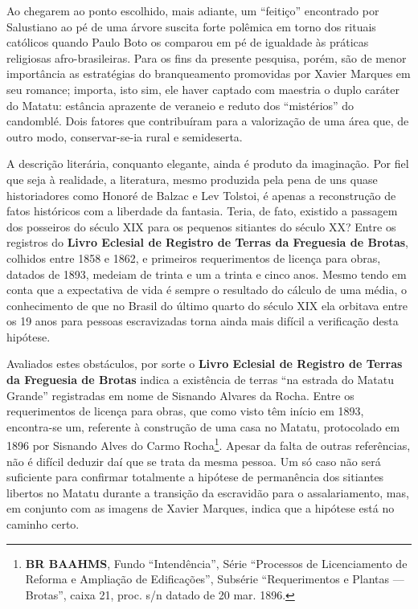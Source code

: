 Ao chegarem ao ponto escolhido, mais adiante, um ``feitiço'' encontrado por Salustiano ao pé de uma árvore suscita forte polêmica em torno dos rituais católicos quando Paulo Boto os comparou em pé de igualdade às práticas religiosas afro-brasileiras. Para os fins da presente pesquisa, porém, são de menor importância as estratégias do branqueamento promovidas por Xavier Marques em seu romance; importa, isto sim, ele haver captado com maestria o duplo caráter do Matatu: estância aprazente de veraneio e reduto dos ``mistérios'' do candomblé. Dois fatores que contribuíram para a valorização de uma área que, de outro modo, conservar-se-ia rural e semideserta.

A descrição literária, conquanto elegante, ainda é produto da imaginação. Por fiel que seja à realidade, a literatura, mesmo produzida pela pena de uns quase historiadores como Honoré de Balzac e Lev Tolstoi, é apenas a reconstrução de fatos históricos com a liberdade da fantasia. Teria, de fato, existido a passagem dos posseiros do século XIX para os pequenos sitiantes do século XX? Entre os registros do \textbf{Livro Eclesial de Registro de Terras da Freguesia de Brotas}, colhidos entre 1858 e 1862, e primeiros requerimentos de licença para obras, datados de 1893, medeiam de trinta e um a trinta e cinco anos. Mesmo tendo em conta que a expectativa de vida é sempre o resultado do cálculo de uma média, o conhecimento de que no Brasil do último quarto do século XIX ela orbitava entre os 19 anos para pessoas escravizadas \cite[p.~303]{schwartz_segredos_1988} torna ainda mais difícil a verificação desta hipótese.

Avaliados estes obstáculos, por sorte o \textbf{Livro Eclesial de Registro de Terras da Freguesia de Brotas} indica a existência de terras ``na estrada do Matatu Grande'' registradas em nome de Sisnando Alvares da Rocha. Entre os requerimentos de licença para obras, que como visto têm início em 1893, encontra-se um, referente à construção de uma casa no Matatu, protocolado em 1896 por Sisnando Alves do Carmo Rocha\footnote{\textbf{BR BAAHMS}, Fundo ``Intendência'', Série ``Processos de Licenciamento de Reforma e Ampliação de Edificações'', Subsérie ``Requerimentos e Plantas --- Brotas'', caixa 21, proc. s/n datado de 20 mar. 1896.}. Apesar da falta de outras referências, não é difícil deduzir daí que se trata da mesma pessoa. Um só caso não será suficiente para confirmar totalmente a hipótese de permanência dos sitiantes libertos no Matatu durante a transição da escravidão para o assalariamento, mas, em conjunto com as imagens de Xavier Marques, indica que a hipótese está no caminho certo.


